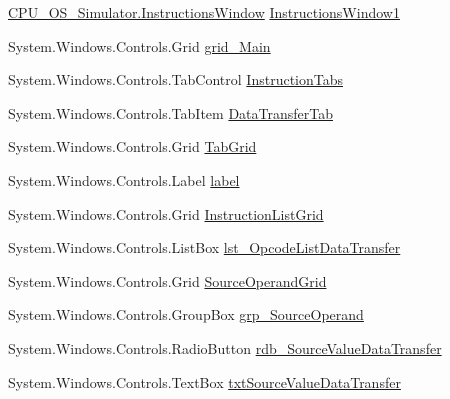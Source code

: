 \begin{DoxyCompactItemize}
\item 
\hyperlink{class_c_p_u___o_s___simulator_1_1_instructions_window}{C\+P\+U\+\_\+\+O\+S\+\_\+\+Simulator.\+Instructions\+Window} \hyperlink{class_c_p_u___o_s___simulator_1_1_instructions_window_ab7cd84f5ba064256327f6b1b1cdbc525}{Instructions\+Window1}
\item 
System.\+Windows.\+Controls.\+Grid \hyperlink{class_c_p_u___o_s___simulator_1_1_instructions_window_a83e86d19573c6c56db33e047354169a1}{grid\+\_\+\+Main}
\item 
System.\+Windows.\+Controls.\+Tab\+Control \hyperlink{class_c_p_u___o_s___simulator_1_1_instructions_window_a2e3784c64a40e14586270c1ebfe8bf3d}{Instruction\+Tabs}
\item 
System.\+Windows.\+Controls.\+Tab\+Item \hyperlink{class_c_p_u___o_s___simulator_1_1_instructions_window_a1076ccccc5b00e3f34ad487bc99b509b}{Data\+Transfer\+Tab}
\item 
System.\+Windows.\+Controls.\+Grid \hyperlink{class_c_p_u___o_s___simulator_1_1_instructions_window_a8e5436d90df63837c7f39586855bda1b}{Tab\+Grid}
\item 
System.\+Windows.\+Controls.\+Label \hyperlink{class_c_p_u___o_s___simulator_1_1_instructions_window_a71ce6968170dda46d83aefc71b63a96d}{label}
\item 
System.\+Windows.\+Controls.\+Grid \hyperlink{class_c_p_u___o_s___simulator_1_1_instructions_window_af568f7891b3381f9bec2f0d5b2d0d8c6}{Instruction\+List\+Grid}
\item 
System.\+Windows.\+Controls.\+List\+Box \hyperlink{class_c_p_u___o_s___simulator_1_1_instructions_window_a03052f893a09b459e840597cf98baffc}{lst\+\_\+\+Opcode\+List\+Data\+Transfer}
\item 
System.\+Windows.\+Controls.\+Grid \hyperlink{class_c_p_u___o_s___simulator_1_1_instructions_window_a6e37ff7da499bab3f5b0037d2b4c68cd}{Source\+Operand\+Grid}
\item 
System.\+Windows.\+Controls.\+Group\+Box \hyperlink{class_c_p_u___o_s___simulator_1_1_instructions_window_ace26d2d0e3de3715d755e91ab04a054a}{grp\+\_\+\+Source\+Operand}
\item 
System.\+Windows.\+Controls.\+Radio\+Button \hyperlink{class_c_p_u___o_s___simulator_1_1_instructions_window_a0798a7bfaace0c96650cf9df53fbf6fd}{rdb\+\_\+\+Source\+Value\+Data\+Transfer}
\item 
System.\+Windows.\+Controls.\+Text\+Box \hyperlink{class_c_p_u___o_s___simulator_1_1_instructions_window_a44cd8a2732d939d1746051f8b2093500}{txt\+Source\+Value\+Data\+Transfer}

\end{DoxyCompactItemize}
